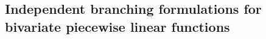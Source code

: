 \documentclass[opre,nonblindrev]{informs3} %
\newcommand{\blue}[1]{{#1}}
\begin{document}


\subsection{Independent branching formulations for bivariate piecewise linear functions}\label{PWLTDSEC}
\end{document}
